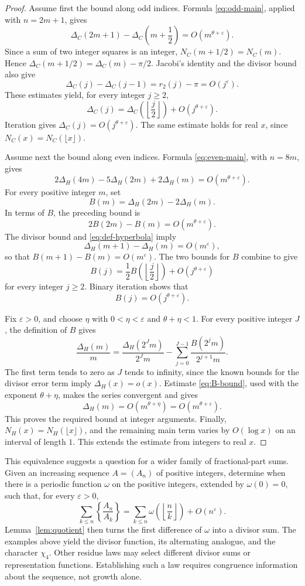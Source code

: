 \documentclass[11pt]{article}
\newcommand{\eps}{\varepsilon}
\begin{document}
\begin{proof}
Assume first the bound along odd indices. Formula \eqref{eq:odd-main}, applied
with $n=2m+1$, gives
\[
 \Delta_C(2m+1)-\Delta_C\left(m+\frac12\right)
 =O(m^{\theta+\eps}).
\]
Since a sum of two integer squares is an integer,
$N_C(m+1/2)=N_C(m)$. Hence
$\Delta_C(m+1/2)=\Delta_C(m)-\pi/2$. Jacobi's identity and the
divisor bound also give
\[
 \Delta_C(j)-\Delta_C(j-1)=r_2(j)-\pi=O(j^\eps).
\]
These estimates yield, for every integer $j\geq 2$,
\[
 \Delta_C(j)=\Delta_C\left(\left\lfloor\frac j2\right\rfloor\right)
 +O(j^{\theta+\eps}).
\]
Iteration gives $\Delta_C(j)=O(j^{\theta+\eps})$. The same estimate holds
for real $x$, since $N_C(x)=N_C(\lfloor x\rfloor)$.

Assume next the bound along even indices. Formula \eqref{eq:even-main}, with
$n=8m$, gives
\[
 2\Delta_H(4m)-5\Delta_H(2m)+2\Delta_H(m)
 =O(m^{\theta+\eps}).
\]
For every positive integer $m$, set
\[
 B(m)=\Delta_H(2m)-2\Delta_H(m).
\]
In terms of $B$, the preceding bound is
\[
 2B(2m)-B(m)=O(m^{\theta+\eps}).
\]
The divisor bound and \eqref{eq:def-hyperbola} imply
\[
 \Delta_H(m+1)-\Delta_H(m)=O(m^\eps),
\]
so that $B(m+1)-B(m)=O(m^\eps)$. The two bounds for $B$ combine to give
\[
 B(j)=\frac12B\left(\left\lfloor\frac j2\right\rfloor\right)
 +O(j^{\theta+\eps})
\]
for every integer $j\geq 2$. Binary iteration shows that
\begin{equation}\label{eq:B-bound}
 B(j)=O(j^{\theta+\eps}).
\end{equation}

Fix $\eps>0$, and choose $\eta$ with
$0<\eta<\eps$ and $\theta+\eta<1$. For every positive integer $J$, the
definition of $B$ gives
\[
 \frac{\Delta_H(m)}m
 =\frac{\Delta_H(2^Jm)}{2^Jm}
 -\sum_{j=0}^{J-1}\frac{B(2^jm)}{2^{j+1}m}.
\]
The first term tends to zero as $J$ tends to infinity, since the known bounds
for the divisor error term imply $\Delta_H(x)=o(x)$. Estimate
\eqref{eq:B-bound}, used with the exponent $\theta+\eta$, makes the series
convergent and gives
\[
 \Delta_H(m)=O(m^{\theta+\eta})=O(m^{\theta+\eps}).
\]
This proves the required bound at integer arguments. Finally,
$N_H(x)=N_H(\lfloor x\rfloor)$, and the remaining main term varies by
$O(\log x)$ on an interval of length $1$. This extends the estimate from
integers to real $x$.
\end{proof}

This equivalence suggests a question for a wider family of fractional-part
sums.
Given an increasing sequence $A=(A_n)$ of positive integers, determine when
there is a periodic function $\omega$ on the positive integers, extended by
$\omega(0)=0$, such that, for every $\eps>0$,
\[
 \sum_{k\leq n}\left\{\frac{A_n}{A_k}\right\}
 =\sum_{k\leq n}
 \omega\left(\left\lfloor\frac nk\right\rfloor\right)
 +O(n^\eps).
\]
Lemma~\ref{lem:quotient} then turns the first difference of $\omega$ into a
divisor sum. The examples above yield the divisor function, its alternating
analogue, and the character $\chi_4$. Other residue laws may select different
divisor sums or representation functions.
Establishing such a law requires congruence information about the sequence,
not growth alone.
\end{document}
